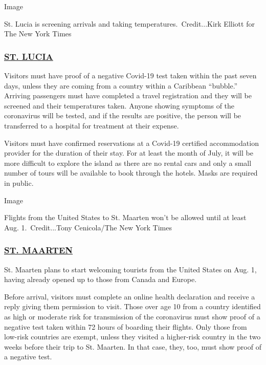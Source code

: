 Image

St. Lucia is screening arrivals and taking temperatures.~Credit...Kirk
Elliott for The New York Times

\hypertarget{st-lucia}{%
\subsubsection{\texorpdfstring{\href{https://www.stlucia.org/en/covid-19/}{ST.
LUCIA}}{ST. LUCIA}}\label{st-lucia}}

Visitors must have proof of a negative Covid-19 test taken within the
past seven days, unless they are coming from a country within a
Caribbean ``bubble.'' Arriving passengers must have completed a travel
registration and they will be screened and their temperatures taken.
Anyone showing symptoms of the coronavirus will be tested, and if the
results are positive, the person will be transferred to a hospital for
treatment at their expense.

Visitors must have confirmed reservations at a Covid-19 certified
accommodation provider for the duration of their stay. For at least the
month of July, it will be more difficult to explore the island as there
are no rental cars and only a small number of tours will be available to
book through the hotels. Masks are required in public.

Image

Flights from the United States to St. Maarten won't be allowed until at
least Aug. 1.~Credit...Tony Cenicola/The New York Times

\hypertarget{st-maarten}{%
\subsubsection{\texorpdfstring{\href{https://stmaartenupdates.com}{ST.
MAARTEN}}{ST. MAARTEN}}\label{st-maarten}}

St. Maarten plans to start welcoming tourists from the United States on
Aug. 1, having already opened up to those from Canada and Europe.

Before arrival, visitors must complete an online health declaration and
receive a reply giving them permission to visit. Those over age 10 from
a country identified as high or moderate risk for transmission of the
coronavirus must show proof of a negative test taken within 72 hours of
boarding their flights. Only those from low-risk countries are exempt,
unless they visited a higher-risk country in the two weeks before their
trip to St. Maarten. In that case, they, too, must show proof of a
negative test.


